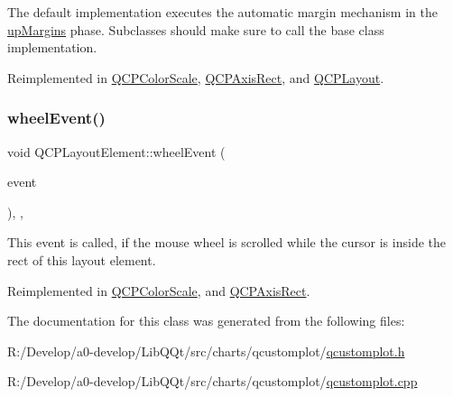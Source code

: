 The default implementation executes the automatic margin mechanism in the \mbox{\hyperlink{class_q_c_p_layout_element_a0d83360e05735735aaf6d7983c56374da288cb59a92280e47261a341f2813e676}{up\+Margins}} phase. Subclasses should make sure to call the base class implementation. 

Reimplemented in \mbox{\hyperlink{class_q_c_p_color_scale_ab8f6991ac88243fc582b44b183670334}{Q\+C\+P\+Color\+Scale}}, \mbox{\hyperlink{class_q_c_p_axis_rect_a255080a017df9083a60a321ef2ba9ed8}{Q\+C\+P\+Axis\+Rect}}, and \mbox{\hyperlink{class_q_c_p_layout_a34ab477e820537ded7bade4399c482fd}{Q\+C\+P\+Layout}}.

\mbox{\label{class_q_c_p_layout_element_a300521d2fd18a893c1b85f6be11ce2bf}} 
\subsubsection{\texorpdfstring{wheel\+Event()}{wheelEvent()}}
{\footnotesize\ttfamily void Q\+C\+P\+Layout\+Element\+::wheel\+Event (\begin{DoxyParamCaption}\item[{Q\+Wheel\+Event $\ast$}]{event }\end{DoxyParamCaption})\hspace{0.3cm}{\ttfamily [inline]}, {\ttfamily [protected]}, {\ttfamily [virtual]}}

This event is called, if the mouse wheel is scrolled while the cursor is inside the rect of this layout element. 

Reimplemented in \mbox{\hyperlink{class_q_c_p_color_scale_ab398e14c01240f3dc855884fe9e1ee8c}{Q\+C\+P\+Color\+Scale}}, and \mbox{\hyperlink{class_q_c_p_axis_rect_a5acf41fc30aa68ea263246ecfad85c31}{Q\+C\+P\+Axis\+Rect}}.



The documentation for this class was generated from the following files\+:\begin{DoxyCompactItemize}
\item 
R\+:/\+Develop/a0-\/develop/\+Lib\+Q\+Qt/src/charts/qcustomplot/\mbox{\hyperlink{qcustomplot_8h}{qcustomplot.\+h}}\item 
R\+:/\+Develop/a0-\/develop/\+Lib\+Q\+Qt/src/charts/qcustomplot/\mbox{\hyperlink{qcustomplot_8cpp}{qcustomplot.\+cpp}}\end{DoxyCompactItemize}
